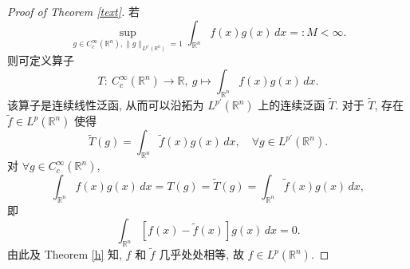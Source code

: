 \documentclass[a4paper,11pt]{article}
\theoremstyle{definition}
\begin{document}
\begin{CJK*}{UTF8}{gbsn}
\begin{proof}[Proof of Theorem \ref{text}]
    若
    $$
        \sup_{g \in C_c^\infty(\mathbb{R}^n), \| g \|_{L^{p'}(\mathbb{R}^n)} = 1} 
            \int_{\mathbb{R}^n} f(x) g(x) \, dx =: M < \infty.
    $$
    则可定义算子
    $$
        T :\ C_c^\infty(\mathbb{R}^n) \to \mathbb{R},\ g \mapsto \int_{\mathbb{R}^n} f(x) g(x) \, dx.
    $$
    该算子是连续线性泛函, 从而可以沿拓为 $ L^{p'}(\mathbb{R}^n) $ 上的连续泛函 $ \widetilde{T} $.
    对于 $ \widetilde{T} $, 存在 $ \tilde{f} \in L^p(\mathbb{R}^n) $ 使得 
    $$
        \widetilde{T}(g) = \int_{\mathbb{R}^n} \tilde{f}(x) g(x) \, dx, \quad \forall g \in L^{p'}(\mathbb{R}^n).
    $$
    对 $ \forall g \in C_c^\infty(\mathbb{R}^n) $,
    $$
        \int_{\mathbb{R}^n} f(x) g(x) \, dx = T(g) = \widetilde{T}(g) = \int_{\mathbb{R}^n} \tilde{f}(x) g(x) \, dx,
    $$
    即
    $$
        \int_{\mathbb{R}^n} \left[f(x) - \tilde{f}(x)\right] g(x) \, dx = 0.
    $$
    由此及 Theorem \ref{h} 知, $ f $ 和 $ \tilde{f} $ 几乎处处相等, 故 $ f \in L^p(\mathbb{R}^n) $.
\end{proof}


\end{CJK*}
\end{document}
